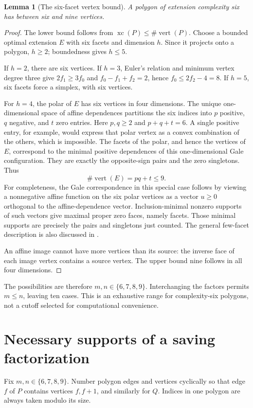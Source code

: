 \documentclass[11pt,a4paper]{article}
\newcommand{\xc}{\operatorname{xc}}
\newtheorem{lemma}[theorem]{Lemma}
\theoremstyle{definition}\newtheorem{definition}[theorem]{Definition}
\theoremstyle{remark}\newtheorem{remark}[theorem]{Remark}
\begin{document}
\begin{lemma}[The six-facet vertex bound]\label{lem:nine}
A polygon of extension complexity six has between six and nine vertices.
\end{lemma}
\begin{proof}
The lower bound follows from $\xc(P)\le\#\operatorname{vert}(P)$. Choose a
bounded optimal extension $E$ with six facets and dimension $h$. Since it
projects onto a polygon, $h\ge2$; boundedness gives $h\le5$.

If $h=2$, there are six vertices. If $h=3$, Euler's relation and minimum
vertex degree three give
$2f_1\ge3f_0$ and $f_0-f_1+f_2=2$, hence $f_0\le2f_2-4=8$.
If $h=5$, six facets force a simplex, with six vertices.

For $h=4$, the polar of $E$ has six vertices in four dimensions. The unique
one-dimensional space of affine dependences partitions the six indices into
$p$ positive, $q$ negative, and $t$ zero entries. Here $p,q\ge2$ and
$p+q+t=6$. A single positive entry, for example, would express that polar
vertex as a convex combination of the others, which is impossible.
The facets of the polar, and hence the vertices of $E$, correspond to the
minimal positive dependences of this one-dimensional Gale configuration.
They are exactly the opposite-sign pairs and the zero singletons. Thus
\[
 \#\operatorname{vert}(E)=pq+t\le9.
\]
For completeness, the Gale correspondence in this special case follows by
viewing a nonnegative affine function on the six polar vertices as a vector
$u\ge0$ orthogonal to the affine-dependence vector. Inclusion-minimal nonzero
supports of such vectors give maximal proper zero faces, namely facets.
Those minimal supports are precisely the pairs and singletons just counted.
The general few-facet description is also discussed in \cite{padrol}.

An affine image cannot have more vertices than its source: the inverse face
of each image vertex contains a source vertex. The upper bound nine follows
in all four dimensions.
\end{proof}

The possibilities are therefore $m,n\in\{6,7,8,9\}$. Interchanging the
factors permits $m\le n$, leaving ten cases. This is an exhaustive range for
complexity-six polygons, not a cutoff selected for computational convenience.

\section{Necessary supports of a saving factorization}\label{sec:support}
Fix $m,n\in\{6,7,8,9\}$. Number polygon edges and vertices cyclically so that
edge $f$ of $P$ contains vertices $f,f+1$, and similarly for $Q$. Indices in
one polygon are always taken modulo its size.
\end{document}
